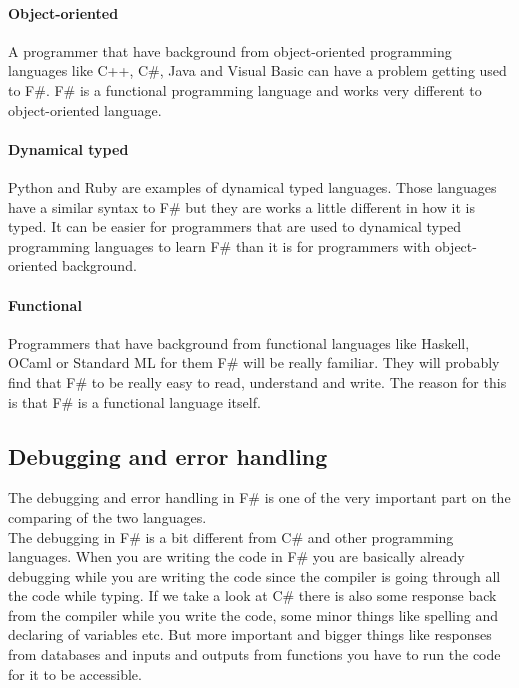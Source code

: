 \documentclass[12pt, a4paper]{article}
\newcommand*\quotefont{\fontfamily{LinuxLibertineT-LF}} %
\newcommand*\quotesize{60} %
\newcommand*{\openquote}
   {\tikz[remember picture,overlay,xshift=-4ex,yshift=-2.5ex]
   \node (OQ) {\quotefont\fontsize{\quotesize}{\quotesize}\selectfont``};\kern0pt}
\newcommand*{\closequote}[1]
  {\tikz[remember picture,overlay,xshift=4ex,yshift={#1}]
   \node (CQ) {\quotefont\fontsize{\quotesize}{\quotesize}\selectfont''};}
\newcommand*\shadedauthorformat{\emph} %
\newcommand*\authoralign[1]{
 	\def\authorfill{\hfill}\def\quotefill{}
}
\newenvironment{shadequote}[2][l]%
{\authoralign{#1}
\ifblank{#2}
   {\def\shadequoteauthor{}\def\yshift{-2ex}\def\quotefill{\hfill}}
   {\def\shadequoteauthor{\par\authorfill\shadedauthorformat{#2}}\def\yshift{2ex}}
\begin{snugshade}\begin{quote}\openquote}
{\shadequoteauthor\quotefill\closequote{\yshift}\end{quote}\end{snugshade}}
\begin{document}
\paragraph{Object-oriented}
A programmer that have background from object-oriented programming languages like C++, C\#, Java and Visual Basic can have a problem getting used to F\#. F\# is a functional programming language and works very different to object-oriented language.


\paragraph{Dynamical typed}
Python and Ruby are examples of dynamical typed languages. Those languages have a similar syntax to F\# but they are works a little different in how it is typed. It can be easier for programmers that are used to dynamical typed programming languages to learn F\# than it is for programmers with object-oriented background.  


\paragraph{Functional}
Programmers that have background from functional languages like Haskell, OCaml or Standard ML for them F\# will be really familiar. They will probably find that F\# to be really easy to read, understand and write. The reason for this is that F\# is a functional language itself. 

\newpage
\subsection{Debugging and error handling}
\label{debug}
The debugging and error handling in F\# is one of the very important part on the comparing of the two languages.\\
 
The debugging in F\# is a bit different from C\# and other programming languages. When you are writing the code in F\# you are basically already debugging while you are writing the code since the compiler is going through all the code while typing. If we take a look at C\# there is also some response back from the compiler while you write the code, some minor things like spelling and declaring of variables etc. But more important and bigger things like responses from databases and inputs and outputs from functions you have to run the code for it to be accessible.
\end{document}
